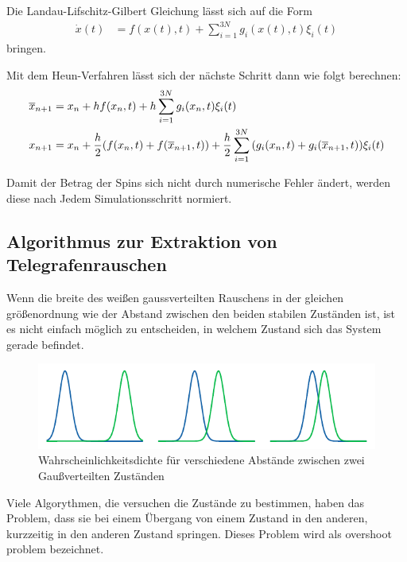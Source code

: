 \documentclass[main.tex]{subfiles}
\begin{document}

Die Landau-Lifschitz-Gilbert Gleichung lässt sich auf die Form
\begin{align}
    \Dot{x}(t) &= f(x(t),t) + \sum_{i=1}^{3N} g_i(x(t),t) \xi_i(t)
\end{align}
bringen. 

Mit dem Heun-Verfahren lässt sich der nächste Schritt dann wie folgt berechnen:
\begin{align}
    \overline{x}_{n+1} &= x_n + h f(x_n,t) + h \sum_{i=1}^{3N} g_i(x_n,t) \xi_i(t) \\
    x_{n+1} &= x_n + \frac{h}{2} \qty(f(x_n,t) + f(\overline{x}_{n+1},t)) + \frac{h}{2} \sum_{i=1}^{3N} \qty(g_i(x_n,t) + g_i(\overline{x}_{n+1},t)) \xi_i(t)
\end{align}



Damit der Betrag der Spins sich nicht durch numerische Fehler ändert, werden diese nach Jedem Simulationsschritt normiert.

\subsection{Algorithmus zur Extraktion von Telegrafenrauschen}

Wenn die breite des weißen gaussverteilten Rauschens in der gleichen größenordnung wie der Abstand zwischen den beiden stabilen Zuständen ist, ist es nicht einfach möglich zu entscheiden, in welchem Zustand sich das System gerade befindet.
\begin{figure}[h]
    \centering
    \includegraphics{bilder/plots/theo-vis/gauss-overlap.pdf}
    \caption{Wahrscheinlichkeitsdichte für verschiedene Abstände zwischen zwei Gaußverteilten Zuständen \label{fig:gauss-overlap}}
\end{figure}

Viele Algorythmen, die versuchen die Zustände zu bestimmen, haben das Problem, dass sie bei einem Übergang von einem Zustand in den anderen, kurzzeitig in den anderen Zustand springen. Dieses Problem wird als overshoot problem bezeichnet. 
\end{document}
